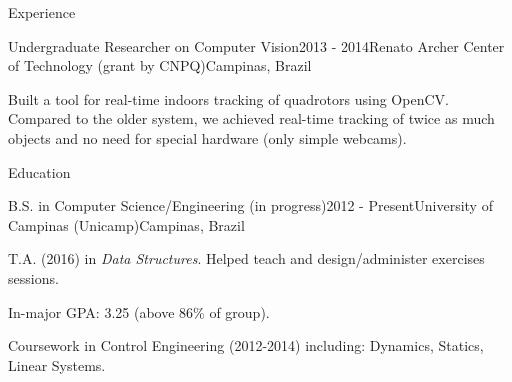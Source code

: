 \documentclass[8pt]{resume}
\newcommand{\tit}[1]{\textit{#1}}
\newcommand{\tbf}[1]{\textbf{#1}}
\newcommand{\ttt}[1]{\texttt{#1}}
\begin{document}
\begin{rSection}{Experience}
\begin{rSubsection}{Undergraduate Researcher on Computer Vision}{2013 - 2014}{Renato Archer Center of Technology (grant by CNPQ)}{Campinas, Brazil}
    \item Built a tool for real-time indoors tracking of
        quadrotors using OpenCV\@. Compared to the older system,
        we achieved real-time tracking of twice as much objects
        and no need for special hardware (only simple webcams).
\end{rSubsection}

\end{rSection}

\begin{rSection}{Education}

    \begin{rSubsection}{B.S. in Computer Science/Engineering (in progress)}{2012 - Present}{University of Campinas (Unicamp)}{Campinas, Brazil}
    \item T.A. (2016) in \tit{Data Structures}. Helped
        teach and design/administer exercises sessions.
    \item In-major GPA: 3.25 (above 86\% of group).
    \item Coursework in Control Engineering (2012-2014) including:
        Dynamics, Statics, Linear Systems.
\end{rSubsection}

\end{rSection}

\end{document}
